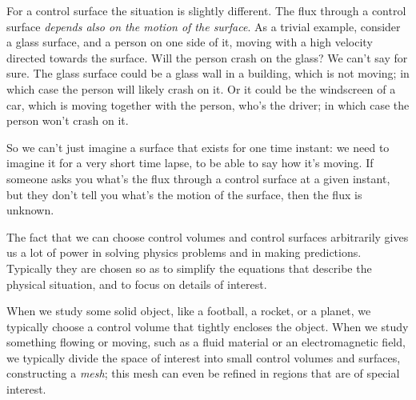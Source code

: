 \documentclass[a4paper,12pt,%
onecolumn,oneside,titlepage,%
british%
]{memoir}
\renewcommand*{\|}[1][]{\nonscript\:#1\vert\nonscript\:\mathopen{}}
\begin{document}
%
For a control surface the situation is slightly different. The flux through a control surface \emph{depends also on the motion of the surface}. As a trivial example, consider a glass surface, and a person on one side of it, moving with a high velocity directed towards the surface. Will the person crash on the glass? We can't say for sure. The glass surface could be a glass wall in a building, which is not moving; in which case the person will likely crash on it. Or it could be the windscreen of a car, which is moving together with the person, who's the driver; in which case the person won't crash on it.

So we can't just imagine a surface that exists for one time instant: we need to imagine it for a very short time lapse, to be able to say how it's moving. If someone asks you what's the flux through a control surface at a given instant, but they don't tell you what's the motion of the surface, then the flux is unknown.


\smallskip

The fact that we can choose control volumes and control surfaces arbitrarily gives us a lot of power in solving physics problems and in making predictions. Typically they are chosen so as to simplify the equations that describe the physical situation, and to focus on details of interest.

When we study some solid object, like a football, a rocket, or a planet, we typically choose a control volume that tightly encloses the object. When we study something flowing or moving, such as a fluid material or an electromagnetic field, we typically divide the space of interest into small control volumes and surfaces, constructing a \emph{mesh}; this mesh can even be refined in regions that are of special interest.
\end{document}
